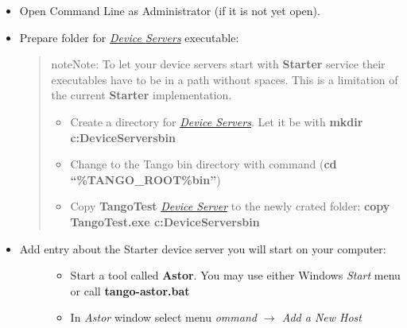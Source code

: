 \documentclass[letterpaper,10pt,english]{sphinxmanual}
\begin{document}
\begin{itemize}
\item {} 
Open Command Line as Administrator (if it is not yet open).

\item {} 
Prepare folder for {\hyperref[glossary:term-device-servers]{\emph{Device Servers}}} executable:
\begin{quote}

\begin{notice}{note}{Note:}
To let your device servers start with \textbf{Starter} service their executables have to be in a path without
spaces. This is a limitation of the current \textbf{Starter} implementation.
\end{notice}
\begin{itemize}
\item {} 
Create a directory for {\hyperref[glossary:term-device-servers]{\emph{Device Servers}}}. Let it be 
with \textbf{mkdir c:DeviceServersbin}

\item {} 
Change to the Tango bin directory with command (\textbf{cd ``\%TANGO\_ROOT\%bin''})

\item {} 
Copy \textbf{TangoTest} {\hyperref[glossary:term-device-server]{\emph{Device Server}}} to the newly crated folder:
\textbf{copy TangoTest.exe c:DeviceServersbin}

\end{itemize}
\end{quote}

\item {} \begin{description}
\item[{Add entry about the Starter device server you will start on your computer:}] \leavevmode\begin{itemize}
\item {} 
Start a tool called \textbf{Astor}. You may use either Windows \emph{Start} menu or
call \textbf{tango-astor.bat}

\item {} 
In \emph{Astor} window select menu \emph{ommand \(\rightarrow\) Add a New Host}


\end{itemize}
\end{description}
\end{itemize}
\end{document}
